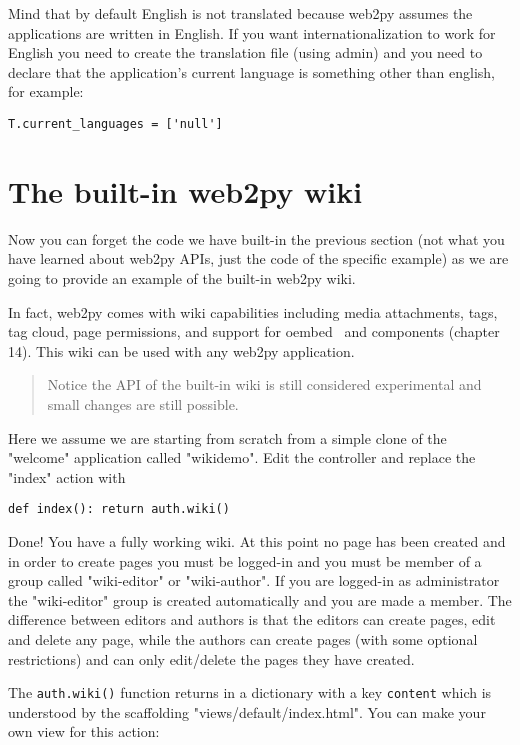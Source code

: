 \documentclass[justified,sixbynine,notoc]{tufte-book}
\def\ft{\small\tt}
\begin{document}
\begin{fullwidth}
Mind that by default English is not translated because web2py assumes the applications are written in English. If you want internationalization to work for English you need to create the translation file (using admin) and you need to declare that the application's current language is something other than english, for example:
\begin{lstlisting}
T.current_languages = ['null']
\end{lstlisting}

\goodbreak\section{The built-in web2py wiki}

Now you can forget the code we have built-in the previous section (not what you have learned about web2py APIs, just the code of the specific example) as we are going to provide an example of the built-in web2py wiki.

In fact, web2py comes with wiki capabilities including media attachments, tags, tag cloud, page permissions, and support for oembed~\cite{oembed} and components (chapter 14). This wiki can be used with any web2py application.

\begin{quote}Notice the API of the built-in wiki is still considered experimental and small changes are still possible.\end{quote}
Here we assume we are starting from scratch from a simple clone of the "welcome" application called "wikidemo". Edit the controller and replace the "index" action with

\begin{lstlisting}
def index(): return auth.wiki()
\end{lstlisting}

Done! You have a fully working wiki. At this point no page has been created and in order to create pages you must be logged-in and you must be member of a group called "wiki-editor" or "wiki-author". If you are logged-in as administrator the "wiki-editor" group is created automatically and you are made a member. The difference between editors and authors is that the editors can create pages, edit and delete any page, while the authors can create pages (with some optional restrictions) and can only edit/delete the pages they have created.

The {\ft auth.wiki()} function returns in a dictionary with a key {\ft content} which is understood by the scaffolding "views/default/index.html". You can make your own view for this action:


\end{fullwidth}
\end{document}
